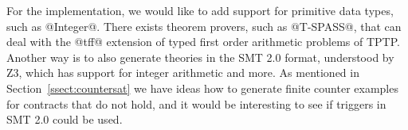 For the implementation, we would like to add support for primitive
data types, such as @Integer@. There exists theorem provers, such as
@T-SPASS@, that can deal with the @tff@ extension of typed first order
arithmetic problems of TPTP. Another way is to also generate theories
in the SMT 2.0 format, understood by Z3, which has support for
integer arithmetic and more.
As mentioned in Section~\ref{ssect:countersat} we have ideas how to
generate finite counter examples for contracts that do not hold,
and it would be interesting to see if triggers in SMT 2.0 could be used.
